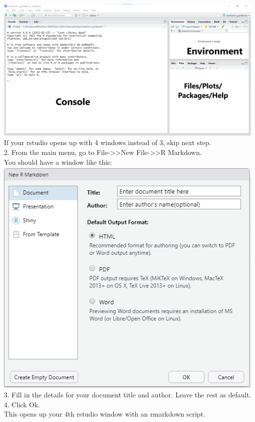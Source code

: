 \documentclass[
]{book}
\begin{document}
\includegraphics{tutorial_screenshots/rstudio_panels.png}\\
If your rstudio opens up with 4 windows instead of 3, skip next step.\\
2. From the main menu, go to File-\textgreater\textgreater New File-\textgreater\textgreater R Markdown.\\
You should have a window like this:\\
\includegraphics{tutorial_screenshots/open_rmd_file.png}\\
3. Fill in the details for your document title and author. Leave the rest as default.\\
4. Click Ok.\\
This opens up your 4th rstudio window with an rmarkdown script.\\
\end{document}
